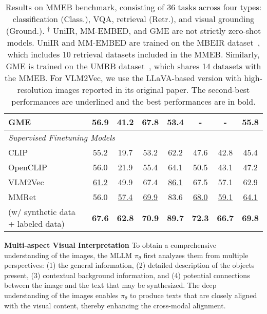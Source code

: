 \begin{table*}[h]
\begin{tabular}{lccccccc}
GME~\cite{GME}   & {56.9}              & {41.2} & {67.8}      & {53.4}      & - & -     & {55.8} \\
\midrule
\multicolumn{7}{l}{\textit{Supervised Finetuning Models}}                   \\
CLIP~\cite{CLIP}                     & 55.2           & 19.7 & 53.2      & 62.2      & 47.6     & 42.8     & 45.4        \\
OpenCLIP~\cite{OpenCLIP}                 & {56.0}           & 21.9 & 55.4      & 64.1      & 50.5     & 43.1     & 47.2        \\
VLM2Vec~\cite{MMEB}        & \underline{61.2}           & {49.9} & {67.4}      & \underline{86.1}      & {67.5}     & {57.1}     & {62.9}        \\
MMRet~\cite{megapairs} & {56.0}           & \underline{57.4} & \underline{69.9}      & {83.6}      & \underline{68.0}     & \underline{59.1}     & \underline{64.1} \\
\rowcolor{gray!20}
{\ours{}} (w/ synthetic data + labeled data)             & \textbf{67.6}           & \textbf{62.8} & \textbf{70.9}      & \textbf{89.7}      & \textbf{72.3}     & \textbf{66.7}     & \textbf{69.8}  \\

\bottomrule
\end{tabular}
\vspace{-0.1cm}
\caption{Results on MMEB benchmark, consisting of 36 tasks across four types: classification (Class.), VQA, retrieval (Retr.), and visual grounding (Ground.).
$^\dag$ UniIR, MM-EMBED, and GME are not strictly zero-shot models. 
UniIR and MM-EMBED are trained on the MBEIR dataset~\cite{UniIR}, which includes 10 retrieval datasets included in the MMEB. 
Similarly, GME is trained on the UMRB dataset~\cite{GME}, which shares 14 datasets with the MMEB.
For VLM2Vec, we use the LLaVA-based version with high-resolution images reported in its original paper.
The second-best performances are underlined and the best performances are in bold.
}
\label{tab:mmeb}
\end{table*}


\noindent \textbf{Multi-aspect Visual Interpretation}
To obtain a comprehensive understanding of the images, the MLLM $\pi_{\theta}$ first analyzes them from multiple perspectives:
(1) the general information,
(2) detailed description of the objects present,
(3) contextual background information, and
(4) potential connections between the image and the text that may be synthesized.
The deep understanding of the images enables $\pi_{\theta}$ to produce texts that are closely aligned with the visual content, thereby enhancing the cross-modal alignment.


